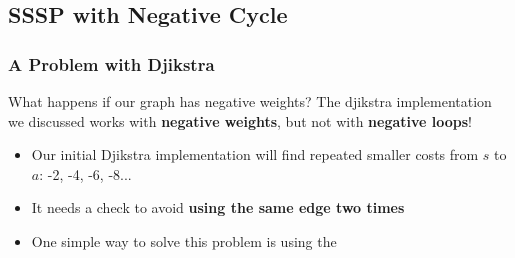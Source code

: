 \documentclass{beamer}
\begin{document}
\subsection{SSSP with Negative Cycle}
\begin{frame}
  \frametitle{A Problem with Djikstra}

  {\smaller
    \begin{block}{What happens if our graph has negative weights?}
      The djikstra implementation we discussed works with {\bf negative weights},
      but not with {\bf negative loops}!
    \end{block}

    \begin{center}
    \end{center}
    
    \begin{itemize}
    \item Our initial Djikstra implementation will find repeated smaller costs
      from $s$ to $a$: -2, -4, -6, -8...
    \item It needs a check to avoid {\bf using the same edge two times}
    \item One simple way to solve this problem is using the 
    \end{itemize}
  }
\end{frame}
\end{document}
